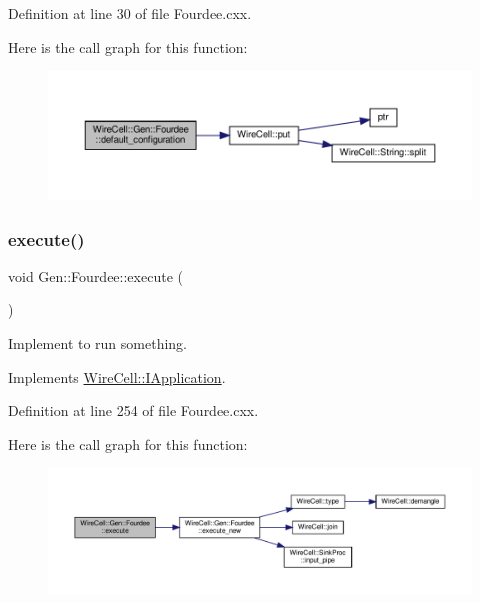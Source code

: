 Definition at line 30 of file Fourdee.\+cxx.

Here is the call graph for this function\+:
\nopagebreak
\begin{figure}[H]
\begin{center}
\leavevmode
\includegraphics[width=350pt]{class_wire_cell_1_1_gen_1_1_fourdee_a36c5e467b00f1598b8063f30aa33d981_cgraph}
\end{center}
\end{figure}
\mbox{\label{class_wire_cell_1_1_gen_1_1_fourdee_ad7e5725da98e74348a3151e9ddd75cde}} 
\subsubsection{\texorpdfstring{execute()}{execute()}}
{\footnotesize\ttfamily void Gen\+::\+Fourdee\+::execute (\begin{DoxyParamCaption}{ }\end{DoxyParamCaption})\hspace{0.3cm}{\ttfamily [virtual]}}



Implement to run something. 



Implements \hyperlink{class_wire_cell_1_1_i_application_a5c77275a37093541aaad6410d8ce5c31}{Wire\+Cell\+::\+I\+Application}.



Definition at line 254 of file Fourdee.\+cxx.

Here is the call graph for this function\+:
\nopagebreak
\begin{figure}[H]
\begin{center}
\leavevmode
\includegraphics[width=350pt]{class_wire_cell_1_1_gen_1_1_fourdee_ad7e5725da98e74348a3151e9ddd75cde_cgraph}
\end{center}
\end{figure}
\mbox{\label{class_wire_cell_1_1_gen_1_1_fourdee_a316c2ab798af8812a737b05ad5a788ae}} 
